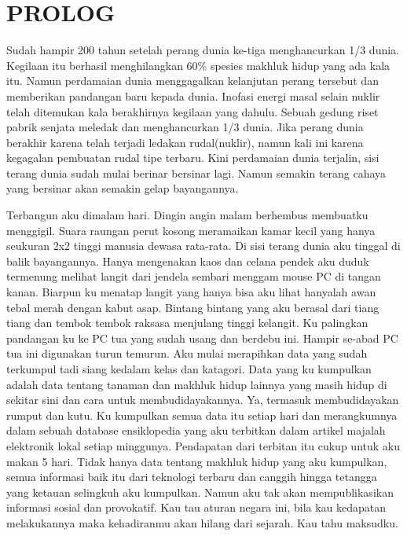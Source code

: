 \chapter{PROLOG}

Sudah hampir 200 tahun setelah perang dunia ke-tiga menghancurkan 1/3 dunia. Kegilaan itu berhasil menghilangkan 60\% spesies makhluk hidup yang ada kala itu. Namun perdamaian dunia menggagalkan kelanjutan perang tersebut dan memberikan pandangan baru kepada dunia. Inofasi energi masal selain nuklir telah ditemukan kala berakhirnya kegilaan yang dahulu. Sebuah gedung riset pabrik senjata meledak dan menghancurkan 1/3 dunia. Jika perang dunia berakhir karena telah terjadi ledakan rudal(nuklir), namun kali ini karena kegagalan pembuatan rudal tipe terbaru. Kini perdamaian dunia terjalin, sisi terang dunia sudah mulai berinar bersinar lagi. Namun semakin terang cahaya yang bersinar akan semakin gelap bayangannya.

Terbangun aku dimalam hari. Dingin angin malam berhembus membuatku menggigil. Suara raungan perut kosong meramaikan kamar kecil yang hanya seukuran 2x2 tinggi manusia dewasa rata-rata. Di sisi terang dunia aku tinggal di balik bayangannya. Hanya mengenakan kaos dan celana pendek aku duduk termenung melihat langit dari jendela sembari menggam mouse PC di tangan kanan. Biarpun ku menatap langit yang hanya bisa aku lihat hanyalah awan tebal merah dengan kabut asap. Bintang bintang yang aku berasal dari tiang tiang dan tembok tembok raksasa menjulang tinggi kelangit. Ku palingkan pandangan ku ke PC tua yang sudah usang dan berdebu ini. Hampir se-abad PC tua ini digunakan turun temurun. Aku mulai merapihkan data yang sudah terkumpul tadi siang kedalam kelas dan katagori. Data yang ku kumpulkan adalah data tentang tanaman dan makhluk hidup lainnya yang masih hidup di sekitar sini dan cara untuk membudidayakannya. Ya, termasuk membudidayakan rumput dan kutu. Ku kumpulkan semua data itu setiap hari dan merangkumnya dalam sebuah database ensiklopedia yang aku terbitkan dalam artikel majalah elektronik lokal setiap minggunya. Pendapatan dari terbitan itu cukup untuk aku makan 5 hari. Tidak hanya data tentang makhluk hidup yang aku kumpulkan, semua informasi baik itu dari teknologi terbaru dan canggih hingga tetangga yang ketauan selingkuh aku kumpulkan. Namun aku tak akan mempublikasikan informasi sosial dan provokatif. Kau tau aturan negara ini, bila kau kedapatan melakukannya maka kehadiranmu akan hilang dari sejarah. Kau tahu maksudku.

